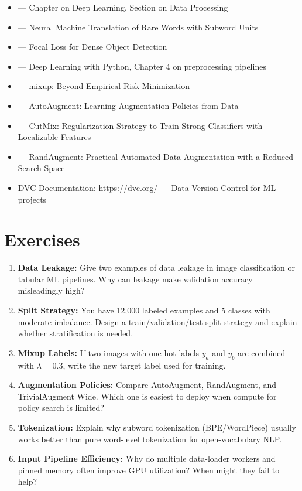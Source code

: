 \begin{itemize}
    \item \cite{goodfellow2016deep} --- Chapter on Deep Learning, Section on Data Processing
    \item \cite{sennrich2016neural} --- Neural Machine Translation of Rare Words with Subword Units
    \item \cite{lin2017focal} --- Focal Loss for Dense Object Detection
    \item \cite{chollet2017deep} --- Deep Learning with Python, Chapter 4 on preprocessing pipelines
    \item \cite{zhang2018mixup} --- mixup: Beyond Empirical Risk Minimization
    \item \cite{cubuk2019autoaugment} --- AutoAugment: Learning Augmentation Policies from Data
    \item \cite{yun2019cutmix} --- CutMix: Regularization Strategy to Train Strong Classifiers with Localizable Features
    \item \cite{cubuk2020randaugment} --- RandAugment: Practical Automated Data Augmentation with a Reduced Search Space
    \item DVC Documentation: \url{https://dvc.org/} --- Data Version Control for ML projects
\end{itemize}

\section{Exercises}

\begin{enumerate}
    \item \textbf{Data Leakage:} Give two examples of data leakage in image classification or tabular ML pipelines. Why can leakage make validation accuracy misleadingly high?

    \item \textbf{Split Strategy:} You have 12,000 labeled examples and 5 classes with moderate imbalance. Design a train/validation/test split strategy and explain whether stratification is needed.

    \item \textbf{Mixup Labels:} If two images with one-hot labels $y_a$ and $y_b$ are combined with $\lambda = 0.3$, write the new target label used for training.

    \item \textbf{Augmentation Policies:} Compare AutoAugment, RandAugment, and TrivialAugment Wide. Which one is easiest to deploy when compute for policy search is limited?

    \item \textbf{Tokenization:} Explain why subword tokenization (BPE/WordPiece) usually works better than pure word-level tokenization for open-vocabulary NLP.

    \item \textbf{Input Pipeline Efficiency:} Why do multiple data-loader workers and pinned memory often improve GPU utilization? When might they fail to help?
\end{enumerate}

